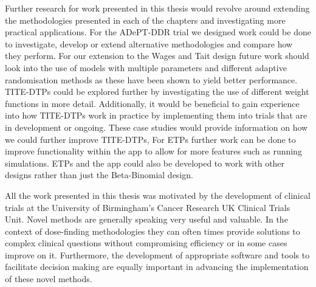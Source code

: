 Further research for work presented in this thesis would revolve around extending the methodologies presented in each of the chapters and investigating more practical applications. For the ADePT-DDR trial we designed work could be done to investigate, develop or extend alternative methodologies and compare how they perform. For our extension to the Wages and Tait design future work should look into the use of models with multiple parameters and different adaptive randomisation methods as these have been shown to yield better performance. TITE-DTPs could be explored further by investigating the use of different weight functions in more detail. Additionally, it would be beneficial to gain experience into how TITE-DTPs work in practice by implementing them into trials that are in development or ongoing. These case studies would provide information on how we could further improve TITE-DTPs, For ETPs further work can be done to improve functionality within the app to allow for more features such as running simulations. ETPs and the app could also be developed to work with other designs rather than just the Beta-Binomial design. 

All the work presented in this thesis was motivated by the development of clinical trials at the University of Birmingham's Cancer Research UK Clinical Trials Unit. Novel methods are generally speaking very useful and valuable. In the context of dose-finding methodologies they can often times provide solutions to complex clinical questions without compromising efficiency or in some cases improve on it. Furthermore, the development of appropriate software and tools to facilitate decision making are equally important in advancing the implementation of these novel methods.  
